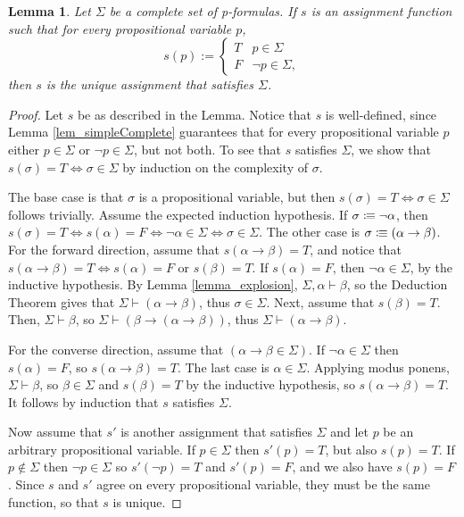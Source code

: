\documentclass[leqno]{article}
\newtheorem{lemma}{Lemma}[section]
\newcommand{\proves}{\vdash}
\newcommand{\is}{\colonequiv}
\newcommand{\limplies}{\rightarrow}
\begin{document}
\begin{lemma} \label{lemma_uniqueAssignment}
    Let $\Sigma$ be a complete set of p-formulas. If $s$ is an assignment function such that for every propositional variable $p$,
    \begin{equation*}
        s(p) := \begin{cases}
        T & p \in \Sigma \\
        F & \neg p \in \Sigma,
        \end{cases}
    \end{equation*} then $s$ is the unique assignment that satisfies $\Sigma$.
\end{lemma}

\begin{proof}
     Let $s$ be as described in the Lemma. Notice that $s$ is well-defined, since Lemma \ref{lem_simpleComplete} guarantees that for every propositional variable $p$ either $p \in \Sigma$ or $\neg p \in \Sigma$, but not both. To see that $s$ satisfies $\Sigma$, we show that $s(\sigma) = T \iff \sigma \in \Sigma$ by induction on the complexity of $\sigma$.
     
     The base case is that $\sigma$ is a propositional variable, but then $s(\sigma) = T \iff \sigma \in \Sigma$ follows trivially. Assume the expected induction hypothesis. If $\sigma \is \neg \alpha$, then $s(\sigma) = T \iff s(\alpha) = F \iff \neg \alpha \in \Sigma \iff \sigma \in \Sigma$. The other case is $\sigma \is (\alpha \limplies \beta)$. For the forward direction, assume that $s(\alpha \limplies \beta) = T$, and notice that $s(\alpha \limplies \beta) = T \iff s(\alpha) = F$ or $s(\beta) = T$. If $s(\alpha) = F$, then $\neg \alpha \in \Sigma$, by the inductive hypothesis. By Lemma \ref{lemma_explosion}, $\Sigma, \alpha \proves \beta$, so the Deduction Theorem gives that $\Sigma \proves (\alpha \limplies \beta)$, thus $\sigma \in \Sigma$. Next, assume that $s(\beta) = T$. Then, $\Sigma \proves \beta$, so $\Sigma \proves (\beta \limplies (\alpha \limplies \beta))$, thus $\Sigma \proves (\alpha \limplies \beta)$.
     
     For the converse direction, assume that $(\alpha \limplies \beta \in \Sigma)$. If $\neg \alpha \in \Sigma$ then $s(\alpha) = F$, so $s(\alpha \limplies \beta) = T$. The last case is $\alpha \in \Sigma$. Applying modus ponens, $\Sigma \proves \beta$, so $\beta \in \Sigma$ and $s(\beta) = T$ by the inductive hypothesis, so $s(\alpha \limplies \beta) = T$. It follows by induction that $s$ satisfies $\Sigma$.
     
     Now assume that $s'$ is another assignment that satisfies $\Sigma$ and let $p$ be an arbitrary propositional variable. If $p \in \Sigma$ then $s'(p) = T$, but also $s(p) = T$. If $p \notin \Sigma$ then $\neg p \in \Sigma$ so $s'(\neg p) = T$ and $s'(p) = F$, and we also have $s(p) = F$. Since $s$ and $s'$ agree on every propositional variable, they must be the same function, so that $s$ is unique.
\end{proof}
\end{document}
